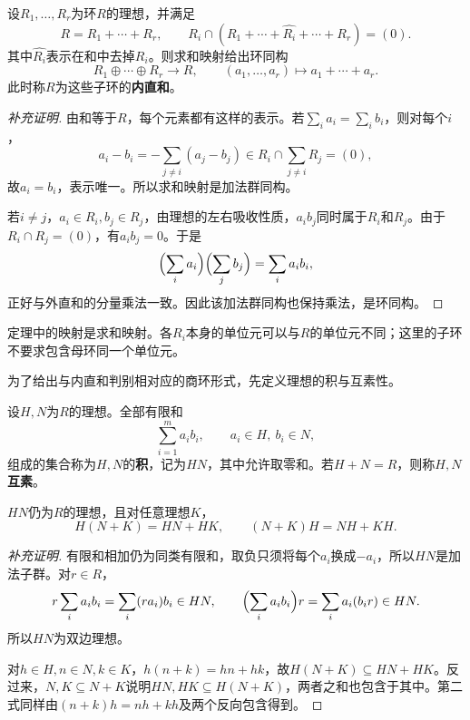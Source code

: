 \begin{theorem}\label{p2:ring-internal-sum}
设$R_1,\ldots,R_r$为环$R$的理想，并满足
\[
R=R_1+\cdots+R_r,\qquad
R_i\cap(R_1+\cdots+\widehat{R_i}+\cdots+R_r)=(0).
\]
其中$\widehat{R_i}$表示在和中去掉$R_i$。则求和映射给出环同构
\[
R_1\oplus\cdots\oplus R_r\longrightarrow R,
\qquad(a_1,\ldots,a_r)\longmapsto a_1+\cdots+a_r.
\]
此时称$R$为这些子环的\textbf{内直和}。
\end{theorem}
\begin{proof}[补充证明]
由和等于$R$，每个元素都有这样的表示。若$\sum_i a_i=\sum_i b_i$，则对每个$i$，
\[
a_i-b_i=-\sum_{j\ne i}(a_j-b_j)
\in R_i\cap\sum_{j\ne i}R_j=(0),
\]
故$a_i=b_i$，表示唯一。所以求和映射是加法群同构。

若$i\ne j$，$a_i\in R_i,b_j\in R_j$，由理想的左右吸收性质，$a_ib_j$同时属于$R_i$和$R_j$。由于$R_i\cap R_j=(0)$，有$a_ib_j=0$。于是
\[
\Bigl(\sum_i a_i\Bigr)\Bigl(\sum_j b_j\Bigr)=\sum_i a_ib_i,
\]
正好与外直和的分量乘法一致。因此该加法群同构也保持乘法，是环同构。
\end{proof}

定理中的映射是求和映射。各$R_i$本身的单位元可以与$R$的单位元不同；这里的子环不要求包含母环同一个单位元。

为了给出与内直和判别相对应的商环形式，先定义理想的积与互素性。

\begin{definition}
设$H,N$为$R$的理想。全部有限和
\[
\sum_{i=1}^m a_ib_i,\qquad a_i\in H,\ b_i\in N,
\]
组成的集合称为$H,N$的\textbf{积}，记为$HN$，其中允许取零和。若$H+N=R$，则称$H,N$\textbf{互素}。
\end{definition}
\begin{proposition}
$HN$仍为$R$的理想，且对任意理想$K$，
\[
H(N+K)=HN+HK,\qquad(N+K)H=NH+KH.
\]
\end{proposition}
\begin{proof}[补充证明]
有限和相加仍为同类有限和，取负只须将每个$a_i$换成$-a_i$，所以$HN$是加法子群。对$r\in R$，
\[
r\sum_i a_ib_i=\sum_i(ra_i)b_i\in HN,
\qquad\Bigl(\sum_i a_ib_i\Bigr)r=\sum_i a_i(b_ir)\in HN.
\]
所以$HN$为双边理想。

对$h\in H,n\in N,k\in K$，$h(n+k)=hn+hk$，故$H(N+K)\subseteq HN+HK$。反过来，$N,K\subseteq N+K$说明$HN,HK\subseteq H(N+K)$，两者之和也包含于其中。第二式同样由$(n+k)h=nh+kh$及两个反向包含得到。
\end{proof}

